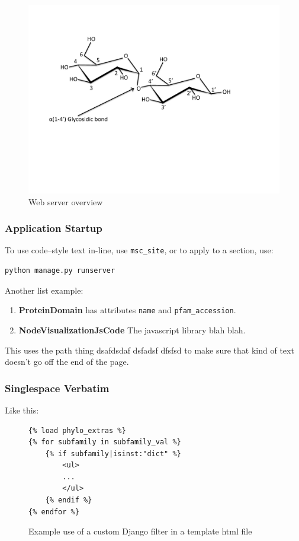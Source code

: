 \documentclass[12pt,a4paper]{article}
\begin{document}
\begin{figure}[H]
\centering 
\includegraphics[scale=0.6]{images/glycosidic_linkage.pdf} 
\caption{Web server overview}
\label{fig:webserver}
\end{figure}

\subsubsection{Application Startup}
\label{sec:startup}
To use code--style text in-line, use \texttt{msc\_site}, or to apply to a section, use:

\begin{verbatim}
python manage.py runserver
\end{verbatim}

Another list example:

\begin{enumerate}
\item {\bf ProteinDomain} has attributes \texttt{name} and \texttt{pfam\_accession}.
\item {\bf NodeVisualizationJsCode} The javascript library blah blah.
\end{enumerate}


This uses the path thing dsafdsdaf dsfadsf dfsfsd  to make sure that kind of text doesn't go off the end of the page. 

\subsubsection{Singlespace Verbatim}
\label{sec:template_tags}
Like this:
\singlespace
\begin{figure}[H]
\begin{verbatim}
{% load phylo_extras %}
{% for subfamily in subfamily_val %}
    {% if subfamily|isinst:"dict" %}
        <ul>
        ...
        </ul>
    {% endif %}
{% endfor %}
\end{verbatim}
\caption{Example use of a custom Django filter in a template html file}
\label{fig:custom_filter_code}
\end{figure}
\doublespace
\end{document}
